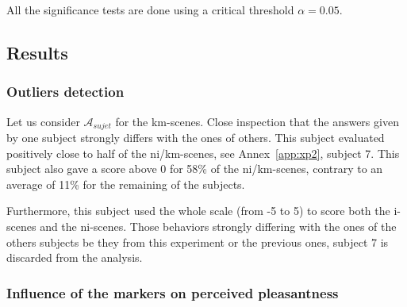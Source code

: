 \documentclass[twoside,twocolumn]{article}
\begin{document}

All the significance tests are done using a critical threshold $\alpha=0.05$.

\subsection{Results}

\subsubsection{Outliers detection}


Let us consider $\mathcal{A}_{sujet}$ for the km-scenes. Close inspection that the answers given by one subject strongly differs with the ones of others. This subject evaluated positively close to half of the ni/km-scenes, see Annex~\ref{app:xp2}, subject 7. This subject also gave a score above 0 for 58\% of the ni/km-scenes, contrary to an average of 11\% for the remaining of the subjects.

Furthermore, this subject used the whole scale (from -5 to 5) to score both the i-scenes and the ni-scenes. Those behaviors strongly differing with the ones of the others subjects be they from this experiment or the previous ones, subject 7 is discarded from the analysis.

\subsubsection{Influence of the markers on perceived pleasantness}

\end{document}

